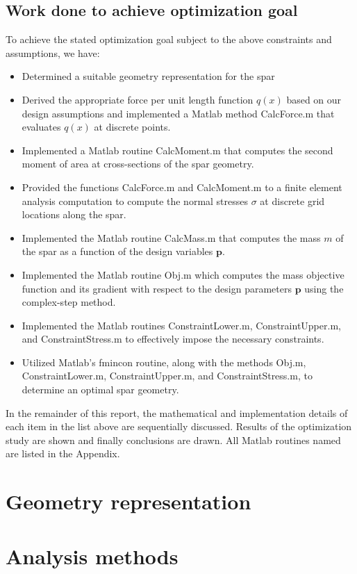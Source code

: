 \documentclass[11pt]{article}
\newcommand{\bs}[1] {\boldsymbol{#1}}
\begin{document}
\subsection{Work done to achieve optimization goal}

To achieve the stated optimization goal subject to the above
constraints and assumptions, we have:
\begin{itemize}
\item Determined a suitable geometry representation for the spar
\item Derived the appropriate force per unit length function
$q(x)$ based on our design assumptions and implemented a Matlab
method CalcForce.m that evaluates $q(x)$ at discrete points.
\item Implemented a Matlab routine CalcMoment.m that computes
the second moment of area at cross-sections of the spar geometry.
\item Provided the functions CalcForce.m and CalcMoment.m to a
finite element analysis computation to compute the normal stresses
$\sigma$ at discrete grid locations along the spar.
\item Implemented the Matlab routine CalcMass.m that computes
the mass $m$ of the spar as a function of the design variables
$\bs{p}$.
\item Implemented the Matlab routine Obj.m which computes the
mass objective function and its gradient with respect to the
design parameters $\bs{p}$ using the complex-step method.
\item Implemented the Matlab routines ConstraintLower.m,
ConstraintUpper.m, and ConstraintStress.m to effectively
impose the necessary constraints.
\item Utilized Matlab's fmincon routine, along with the methods
Obj.m, ConstraintLower.m, ConstraintUpper.m, and ConstraintStress.m,
to determine an optimal spar geometry.
\end{itemize}

In the remainder of this report, the mathematical and
implementation details of each item
in the list above are sequentially discussed.
Results of the optimization study are shown and finally
conclusions are drawn. All Matlab routines named are listed
in the Appendix.

\section{Geometry representation}


\section{Analysis methods}
\end{document}
